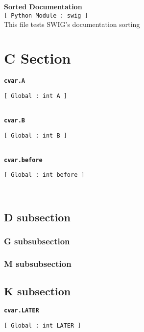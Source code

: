 \setlength{\parindent}{0.0in}
\setlength{\textwidth}{6.5in}
\setlength{\oddsidemargin}{0.0in}
\pagestyle{headings}

{\Large \bf  Sorted Documentation }\\
{\tt [ Python Module : swig ]  }\\
   This file tests SWIG's documentation sorting   
\\\section{C Section}{\tt \bf cvar.A }
\\
\makebox[0.5in]{}\begin{minipage}[t]{6in}
{\tt [ Global : int  A ]  }\\

\end{minipage}\\

{\tt \bf cvar.B }
\\
\makebox[0.5in]{}\begin{minipage}[t]{6in}
{\tt [ Global : int  B ]  }\\

\end{minipage}\\

{\tt \bf cvar.before }
\\
\makebox[0.5in]{}\begin{minipage}[t]{6in}
{\tt [ Global : int  before ]  }\\

\end{minipage}\\

\subsection{D subsection}\subsubsection{G subsubsection}\subsubsection{M subsubsection}\subsection{K subsection}{\tt \bf cvar.LATER }
\\
\makebox[0.5in]{}\begin{minipage}[t]{6in}
{\tt [ Global : int  LATER ]  }\\

\end{minipage}\\

